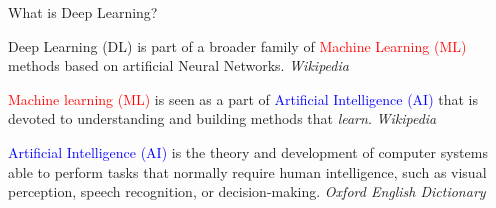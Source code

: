 \def\layersep{1.5cm}

\begin{frame}{What is Deep Learning?}
\begin{minipage}[t]{0.48\linewidth}
\vspace{-0.1cm}
\begin{figure}
    \hspace{-1cm}
    
\end{figure}
\end{minipage}
\begin{minipage}[t]{0.48\linewidth}
\textcolor{jon_green}{Deep Learning (DL)} is part of a broader family of \textcolor{red}{Machine Learning (ML)} methods based on artificial Neural Networks. \textit{Wikipedia}
\vspace{0.2cm}

\textcolor{red}{Machine learning (ML)} is seen as a part of \textcolor{blue}{Artificial Intelligence (AI)} that is devoted to understanding and building methods that \textit{learn}. \textit{Wikipedia}
\vspace{0.2cm}

\textcolor{blue}{Artificial Intelligence (AI)} is the theory and development of computer systems able to perform tasks that normally require human intelligence, such as visual perception, speech recognition, or decision-making. \textit{Oxford English Dictionary}
\end{minipage}
\end{frame}
